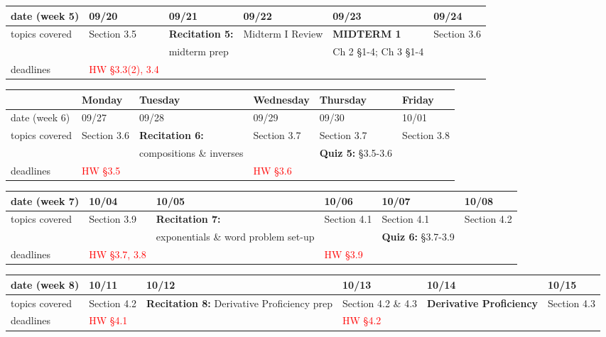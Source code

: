 \documentclass[11pt,fleqn]{article}
\begin{document}
\vfill
\begin{tabularx}{\textwidth}{|X|| X | X | X | X | X |}
\hline
\rowcolor{gray!20}
date (week 5)&09/20&09/21&09/22&09/23&09/24\\ \hline
topics covered&Section 3.5&\textbf{Recitation 5:} &Midterm I Review&\textcolor{dcyan}{\textbf{MIDTERM 1}}&Section 3.6\\
&&midterm prep&&Ch 2 \S 1-4; Ch 3 \S 1-4&\\ \hline
deadlines&\textcolor{red}{HW \S 3.3(2), 3.4}&&&& \\  \hline \hline
\end{tabularx}
\vfill
\newpage

\begin{tabularx}{\textwidth}{|X|| X | X | X | X | X |}
\hline
&Monday & Tuesday & Wednesday & Thursday & Friday \\
\hline \hline
\rowcolor{gray!20}
date (week 6)&09/27&09/28&09/29&09/30&10/01\\ \hline
topics covered&Section 3.6&\textbf{Recitation 6:}&Section 3.7&Section 3.7&Section 3.8\\ 
&&compositions \& inverses&&\textbf{Quiz 5:} \S 3.5-3.6&\\ \hline
deadlines&\textcolor{red}{HW \S3.5}&&\textcolor{red}{HW \S 3.6}&& \\ \hline
\end{tabularx}
\vfill
\begin{tabularx}{\textwidth}{|X|| X | X | X | X | X |}
\hline
\rowcolor{gray!20}
date (week 7)&10/04&10/05&10/06&10/07&10/08\\ \hline
topics covered&Section 3.9&\textbf{Recitation 7:}&Section 4.1&Section 4.1&Section 4.2\\ 
&&exponentials \& word problem set-up&&\textbf{Quiz 6:} \S 3.7-3.9&\\ \hline
deadlines&\textcolor{red}{HW \S 3.7, 3.8}& &\textcolor{red}{HW \S 3.9}&& \\\hline 
\end{tabularx}
\vfill
\begin{tabularx}{\textwidth}{|X|| X | X | X | X | X |}
\hline
\rowcolor{gray!20}
date (week 8)&10/11&10/12&10/13&10/14&10/15\\ \hline
topics covered&Section 4.2&\textbf{Recitation 8:} Derivative Proficiency prep&Section 4.2 \& 4.3&\textcolor{dcyan}{\textbf{Derivative Proficiency}}&Section 4.3\\ 
 \hline
deadlines&\textcolor{red}{HW \S 4.1}&&\textcolor{red}{HW \S 4.2}&& \\ \hline 
\end{tabularx}
\end{document}
